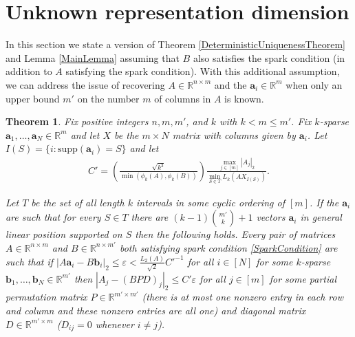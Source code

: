 \documentclass[journal, onecolumn]{IEEEtran}
\newtheorem{theorem}{Theorem}
\begin{document}
\section{Unknown representation dimension}\label{mleqm}

In this section we state a version of Theorem \ref{DeterministicUniquenessTheorem} and Lemma \ref{MainLemma} assuming that $B$ also satisfies the spark condition (in addition to $A$ satisfying the spark condition). With this additional assumption, we can address the issue of recovering $A \in \mathbb{R}^{n \times m}$ and the $\mathbf{a}_i \in \mathbb{R}^m$ when only an upper bound $m'$ on the number $m$ of columns in $A$ is known. 
\begin{theorem}\label{DeterministicUniquenessTheorem2}
Fix positive integers $n, m, m'$, and $k$ with $k < m \leq m'$. Fix $k$-sparse $\mathbf{a}_1, \ldots, \mathbf{a}_N \in \mathbb{R}^m$ and let $X$ be the $m \times N$ matrix with columns given by $\mathbf{a}_i$. Let $I(S) = \{i : \text{supp}(\mathbf{a}_i) = S\}$ and let
\begin{align}\label{Cdef'}
C' = \left( \frac{ \sqrt{k^3}}{ \min(\phi_k(A), \phi_k(B)) } \right) \frac{\max_{j \in [m]} |A_j|_2}{\min_{S \in T} L_k(AX_{I(S)})}.
\end{align}

Let $T$ be the set of all length $k$ intervals in some cyclic ordering of $[m]$. If the $\mathbf{a}_i$ are such that for every $S \in T$ there are $(k-1){m' \choose k}+1$ vectors $\mathbf{a}_i$ in general linear position supported on $S$ then the following holds. Every pair of matrices $A \in \mathbb{R}^{n \times m}$ and $B \in \mathbb{R}^{n \times m'}$ both satisfying spark condition \eqref{SparkCondition} are such that if $|A\mathbf{a}_i - B\mathbf{b}_i|_2 \leq \varepsilon < \frac{L_2(A)}{\sqrt{2}}C'^{-1}$ for all $i \in [N]$ for some $k$-sparse $\mathbf{b}_1, \ldots, \mathbf{b}_N \in \mathbb{R}^{m'}$ then $|A_j-(BPD)_j|_2 \leq C'\varepsilon$ for all $j \in [m]$ for some partial permutation matrix $P \in \mathbb{R}^{m' \times m'}$ (there is at most one nonzero entry in each row and column and these nonzero entries are all one) and diagonal matrix $D \in \mathbb{R}^{m' \times m}$ ($D_{ij} = 0$ whenever $i \neq j$).
\end{theorem}
\end{document}

